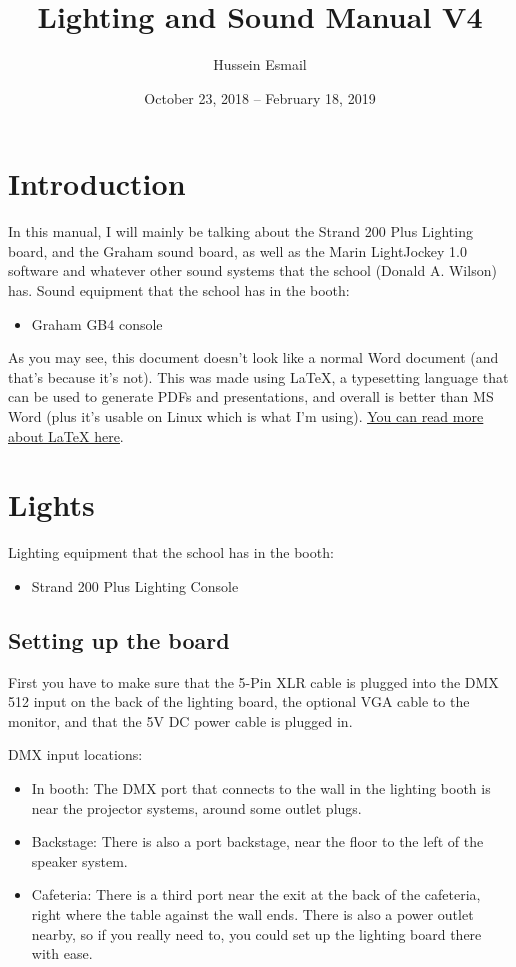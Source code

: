 \documentclass{article}
\title{Lighting and Sound Manual V4}
\author{Hussein Esmail}
\date{October 23, 2018 – February 18, 2019} %
\begin{document}
\maketitle
\newpage
\tableofcontents
\newpage

\section{Introduction}
In this manual, I will mainly be talking about the Strand 200 Plus Lighting board, and the Graham sound board, as well as the Marin LightJockey 1.0 software and whatever other sound systems that the school (Donald A. Wilson) has.
Sound equipment that the school has in the booth:
\begin{itemize}
    \item Graham GB4 console
\end{itemize}

As you may see, this document doesn't look like a normal Word document (and that's because it's not). This was made using \LaTeX{}, a typesetting language that can be used to generate PDFs and presentations, and overall is better than MS Word (plus it's usable on Linux which is what I'm using). \href{https://www.latex-project.org/}{\underline{You can read more about \LaTeX{} here}}.

\section{Lights}
Lighting equipment that the school has in the booth:
\begin{itemize}
    \item Strand 200 Plus Lighting Console
\end{itemize}

\subsection{Setting up the board}
First you have to make sure that the 5-Pin XLR cable is plugged into the DMX 512 input on the back of the lighting board, the optional VGA cable to the monitor, and that the 5V DC power cable is plugged in. 

DMX input locations:
\begin{itemize}
    \item In booth: The DMX port that connects to the wall in the lighting booth is near the projector systems, around some outlet plugs. 
    \item Backstage: There is also a port backstage, near the floor to the left of the speaker system.
    \item Cafeteria: There is a third port near the exit at the back of the cafeteria, right where the table against the wall ends. There is also a power outlet nearby, so if you really need to, you could set up the lighting board there with ease.
\end{itemize}
\end{document}
